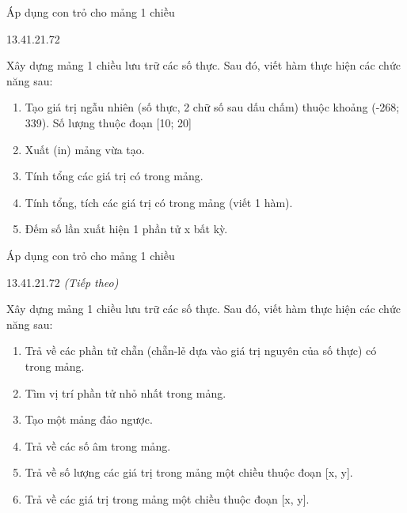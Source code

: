 \begin{frame}{Áp dụng con trỏ cho mảng 1 chiều}
\begin{blk}{13.4}{1.2}{1.72}\fontsize{11.5}{13.8}\selectfont
{}\par
Xây dựng mảng 1 chiều lưu trữ các số thực. Sau đó, viết hàm thực hiện các chức năng sau:
\begin{enumerate}[label=\arabic*.,leftmargin=1.55em,labelindent=0pt,labelsep=0.35em,align=left,itemsep=4pt]
\item Tạo giá trị ngẫu nhiên (số thực, 2 chữ số sau dấu chấm) thuộc khoảng (-268; 339). Số lượng thuộc đoạn [10; 20]
\item Xuất (in) mảng vừa tạo.
\item Tính tổng các giá trị có trong mảng.
\item Tính tổng, tích các giá trị có trong mảng (viết 1 hàm).
\item Đếm số lần xuất hiện 1 phần tử x bất kỳ.
\end{enumerate}
\end{blk}
\end{frame}

\begin{frame}{Áp dụng con trỏ cho mảng 1 chiều}
\begin{blk}{13.4}{1.2}{1.72}\fontsize{11.5}{13.8}\selectfont
{} \textit{(Tiếp theo)}\par
Xây dựng mảng 1 chiều lưu trữ các số thực. Sau đó, viết hàm thực hiện các chức năng sau:
\begin{enumerate}[label=\arabic*.,leftmargin=1.55em,labelindent=0pt,labelsep=0.35em,align=left,itemsep=4pt,start=6]
\item Trả về các phần tử chẵn (chẵn-lẻ dựa vào giá trị nguyên của số thực) có trong mảng.
\item Tìm vị trí phần tử nhỏ nhất trong mảng.
\item Tạo một mảng đảo ngược.
\item Trả về các số âm trong mảng.
\item Trả về số lượng các giá trị trong mảng một chiều thuộc đoạn [x, y].
\item Trả về các giá trị trong mảng một chiều thuộc đoạn [x, y].
\end{enumerate}
\end{blk}
\end{frame}

